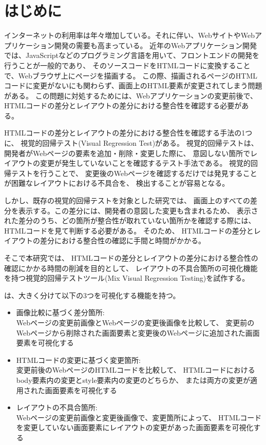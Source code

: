 \chapter{はじめに}\label{cha:Introduction}
インターネットの利用率は年々増加している\cite{Soumusyou}。それに伴い、WebサイトやWebアプリケーション開発の需要も高まっている。
近年のWebアプリケーション開発では、JavaScriptなどのプログラミング言語を用いて、フロントエンドの開発を行うことが一般的であり、
そのソースコードをHTMLコードに変換することで、Webブラウザ上にページを描画する。
この際、描画されるページのHTMLコードに変更がないにも関わらず、画面上のHTML要素が変更されてしまう問題がある。
この問題に対処するためには、Webアプリケーションの変更前後で、HTMLコードの差分とレイアウトの差分における整合性を確認する必要がある。
\par
HTMLコードの差分とレイアウトの差分における整合性を確認する手法の1つに、
視覚的回帰テスト(Visual Regression Test)がある。
視覚的回帰テストは、開発者がWebページの要素を追加・削除・変更した際に、
意図しない箇所でレイアウトの変更が発生していないことを確認するテスト手法である。
視覚的回帰テストを行うことで、
変更後のWebページを確認するだけでは発見することが困難なレイアウトにおける不具合を、
検出することが容易となる。

しかし、既存の視覚的回帰テストを対象とした研究では、
画面上のすべての差分を表示する。この差分には、開発者の意図した変更も含まれるため、
表示された差分のうち、どの箇所が整合性が取れていない箇所かを確認する際には、
HTMLコードを見て判断する必要がある。
そのため、
HTMLコードの差分とレイアウトの差分における整合性の確認に手間と時間がかかる。
\par
そこで本研究では、
HTMLコードの差分とレイアウトの差分における整合性の確認にかかる時間の削減を目的として、
レイアウトの不具合箇所の可視化機能を持つ視覚的回帰テストツール\toolName(Mix Visual Regression Testing)を試作する。
\par
\toolName は、大きく分けて以下の3つを可視化する機能を持つ。
\begin{itemize}
      \item 画像比較に基づく差分箇所:\\
            Webページの変更前画像とWebページの変更後画像を比較して、
            変更前のWebページから削除された画面要素と変更後のWebページに追加された画面要素を可視化する
      \item HTMLコードの変更に基づく変更箇所:\\
            変更前後のWebページのHTMLコードを比較して、
            HTMLコードにおけるbody要素内の変更とstyle要素内の変更のどちらか、
            または両方の変更が適用された画面要素を可視化する
      \item レイアウトの不具合箇所:\\
            Webページの変更前画像と変更後画像で、変更箇所によって、
            HTMLコードを変更していない画面要素にレイアウトの変更があった画面要素を可視化する
\end{itemize}

